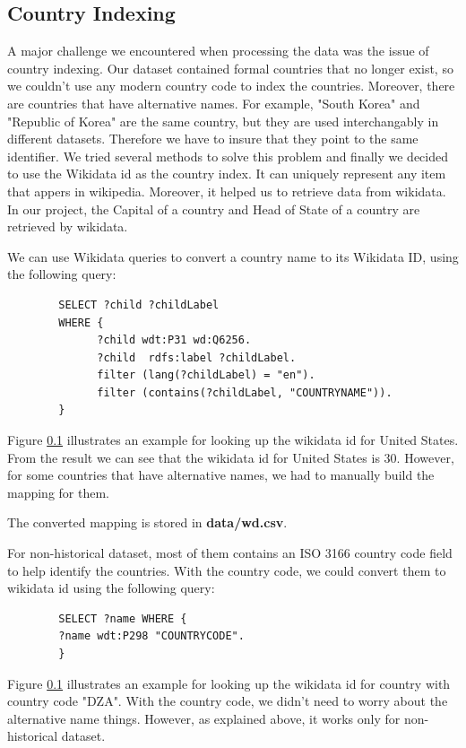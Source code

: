 \documentclass[12pt, fullpage,letterpaper]{article}
\begin{document}
\subsection{Country Indexing}
    A major challenge we encountered when processing the data was the issue of country indexing. Our dataset contained 
    formal countries that no longer exist, so we couldn't use any modern country code to index the countries.
    Moreover, there are countries that have alternative names. For example, "South Korea" and "Republic of Korea" are the same country,
    but they are used interchangably in different datasets.
    Therefore we have to insure that they point to the same identifier.
    We tried several methods to solve this problem and 
    finally we decided to use the Wikidata id as the country index. It can uniquely represent any item that appers in wikipedia.
    Moreover, it helped us to retrieve data from wikidata. In our project, the Capital of a country and Head of State of a country are retrieved by wikidata.

    We can use Wikidata queries to convert a country name to its Wikidata ID, using the following query:

        \begin{verbatim}
        SELECT ?child ?childLabel
        WHERE {
              ?child wdt:P31 wd:Q6256.
              ?child  rdfs:label ?childLabel.
              filter (lang(?childLabel) = "en").
              filter (contains(?childLabel, "COUNTRYNAME")).
        }
        \end{verbatim}

        Figure \ref{} illustrates an example for looking up the wikidata id for United States. From the result we can see that the wikidata id for United States is 30.
        However, for some countries that have alternative names, we had to manually build the mapping for them.

        The converted mapping is stored in \textbf{data/wd.csv}.

        For non-historical dataset, most of them contains an ISO 3166 country code field to help identify the countries. With the country code,
        we could convert them to wikidata id using the following query:

        \begin{verbatim}
        SELECT ?name WHERE {
        ?name wdt:P298 "COUNTRYCODE".
        }
        \end{verbatim}
        Figure \ref{} illustrates an example for looking up the wikidata id for country with country code "DZA".
        With the country code, we didn't need to worry about the alternative name things. However, as explained above,
        it works only for non-historical dataset.
        
\end{document}

